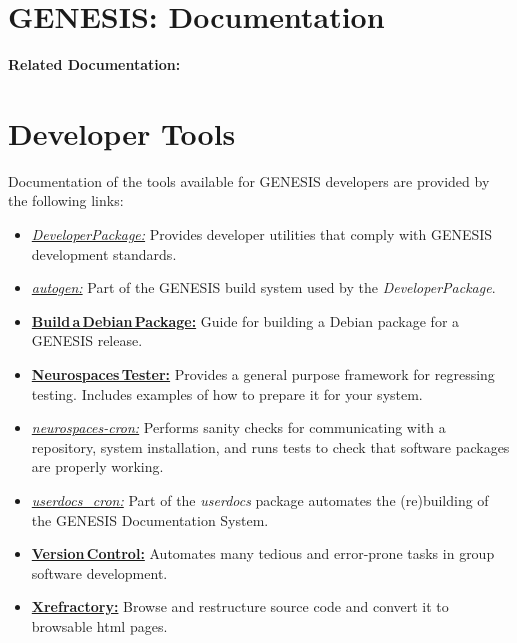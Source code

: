 \documentclass[12pt]{article}
\begin{document}
\section*{GENESIS: Documentation}

{\bf Related Documentation:}

\section*{Developer Tools}

Documentation of the tools available for GENESIS developers are provided by the following links:

\begin{itemize}
   \item[]\href{../developer-package/developer-package.tex}{\it DeveloperPackage:} Provides developer utilities that comply with GENESIS development standards.
   \item[]\href{../autogen/autogen.tex}{\it autogen:} Part of the GENESIS build system used by the {\it DeveloperPackage}.
   \item[]\href{../build-debian/build-debian.tex}{\bf Build\,a\,Debian\,Package:} Guide for building a Debian package for a GENESIS release.
   \item[]\href{../neurospaces-tester/neurospaces-tester.tex}{\bf Neurospaces\,Tester:} Provides a general purpose framework for regressing testing. Includes examples of how to prepare it for your system. 
   \item[]\href{../neurospaces-cron/neurospaces-cron.tex}{\it neurospaces-cron:} Performs sanity checks for communicating with a repository, system installation, and runs tests to check that software packages are properly working.
   \item[]\href{../userdocs-cron/userdocs-cron.tex}{\it userdocs\_cron:} Part of the {\it userdocs} package automates the (re)building of the GENESIS Documentation System.
   \item[]\href{../version-control/version-control.tex}{\bf Version\,Control:} Automates many tedious and error-prone tasks in group software development.
   \item[]\href{../cxref/cxref.tex}{\bf Xrefractory:} Browse and restructure source code and convert it to browsable html pages. 

\end{itemize}
\end{document}
